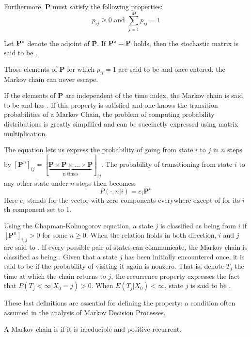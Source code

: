 Furthermore, $\mathbf{P} $ must satisfy the following properties:
\begin{equation}
p_{ij} \geq 0 \mbox{ and } \sum_{j=1}^M p_{ij} =1 
\end{equation}

Let $\mathbf{P}^\star$ denote the adjoint of $\mathbf{P}$. If $\mathbf{P}^\star = \mathbf{P}$ holds, then the stochastic matrix is said to be . 

Those elements of $\mathbf{P}$ for which $p_{ii} = 1$ are said to be
 and once entered, the Markov chain can never escape.

If the elements of $\mathbf{P} $ are independent of the time index, the
Markov chain is said to be  and has . If this property is satisfied and one knows the transition probabilities of
a Markov Chain, the problem of computing probability distributions is greatly
simplified and can be succinctly expressed using matrix multiplication.  

The  equation lets us express the probability of
going from state $i$ to $j$ in $n$ steps by $[\mathbf{P}^n]_{ij} = [
\underbrace{\mathbf{P} \times \mathbf{P} \times \dots \times \mathbf{P}}_{\text{n
times}} ]_{ij}$. The probability of transitioning from state $i$ to any other state under
$n$ steps then becomes:
\begin{equation}
P( \cdot, n | i) = e_i \mathbf{P}^n
\end{equation}
Here $e_i$ stands for the vector with zero components everywhere except of for its
$i$th component set to 1. 

Using the Chapman-Kolmogorov equation, a state $j$ is classified as being
 from $i$ if $[\mathbf{P}^n]_{i,j} > 0$ for some $n \geq 0$. When
the relation holds in both direction, $i$ and $j$ are said to . If
every possible pair of states can communicate, the Markov chain is classified as being
. Given that a state $j$ has been initially encountered once, it is said to be  if the probability of visiting it again is nonzero. That
is, denote $T_j$ the time at which the chain returns to $j$, the recurrence property
expresses the fact that $P(T_j < \infty | X_0 = j) > 0$. When $E(T_j | X_0) < \infty$,
state $j$ is said to be .

These last definitions are essential for defining the 
property: a condition often assumed in the analysis of Markov Decision Processes.
\begin{defn}
A Markov chain is  if it is irreducible and positive recurrent.
\end{defn}

